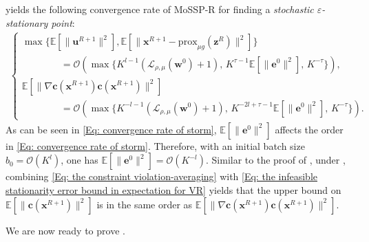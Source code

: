 \documentclass{article}
\theoremstyle{plain}
\theoremstyle{definition}
\theoremstyle{remark}
\newcommand{\EE}{\mathbb{E}}
\newcommand{\prox}{\mathrm{prox}}
\newcommand{\bx}{\bm{x}}
\newcommand{\bc}{\bm{c}}
\newcommand{\be}{\bm{e}}
\newcommand{\bu}{\bm{u}}
\newcommand{\bz}{\bm{z}}
\newcommand{\calL}{\mathcal{L}}
\newcommand{\calO}{\mathcal{O}}
\newcommand{\bw}{\bm{w}}
\numberwithin{equation}{section}
\begin{document}
yields the following convergence rate of MoSSP-R for finding a \textit{stochastic \(\varepsilon\)-stationary point}:
\begin{align}
    \label{Eq: convergence rate of storm}
    \begin{cases}\max\{ \EE [\| \bu^{R+1}\|^{2}], \EE[\| \bx^{R+1}- \prox_{\mu  g}(\bz^{R})\|^{2}]\} \\
    \qquad \qquad =  \calO\!\left(\max\{ K^{l-1}\left( \calL_{\rho, \mu}(\bw^{0})+1\right),\, K^{\tau - 1}\EE [\| \be^{0}\|^{2}],\, K^{-\tau}\}\right), \\ \EE [\|\nabla \bc(\bx^{R+1})\bc(\bx^{R+1})\|^{2}] \\
    \qquad \qquad = \calO\!\left(\max\{ K^{-l-1}\left( \calL_{\rho, \mu }(\bw^{0}) + 1\right),\, K^{-2l + \tau -1 }\EE [\| \be^{0}\|^{2}],\, K^{-\tau}\}\right).
\end{cases}
\end{align}
As can be seen in \eqref{Eq: convergence rate of storm}, \(\EE[\| \be^0 \|^2]\) affects the order in \eqref{Eq: convergence rate of storm}. Therefore, with an initial batch size \(b_0 = \calO(K^{l})\), one has \( \EE[\| \be^0 \|^2] = \calO(K^{-l}) \). Similar to the proof of , under , combining \eqref{Eq: the constraint violation-averaging} with \eqref{Eq: the infeasible stationarity error bound in expectation for VR} yields that the upper bound on \( \EE[\|\bc(\bx^{R+1})\|^{2}] \) is in the same order as \( \EE[\|\nabla \bc(\bx^{R+1}) \bc(\bx^{R+1})\|^{2}] \).

We are now ready to prove .
\end{document}
